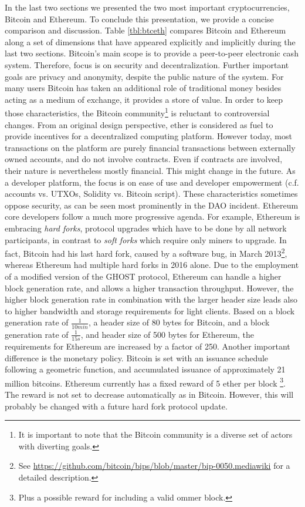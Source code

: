 {In the last two sections we presented the two most important cryptocurrencies, Bitcoin and Ethereum. 
To conclude this presentation, we provide a concise comparison and discussion. Table \ref{tbl:btceth} compares Bitcoin and Ethereum along a set of dimensions that have appeared explicitly and implicitly during the last two sections. Bitcoin's main scope is to provide a peer-to-peer electronic cash system. Therefore, focus is on security and decentralization. Further important goals are privacy and anonymity, despite the public nature of the system. For many users Bitcoin has taken an additional role of traditional money besides acting as a medium of exchange, it provides a store of value. In order to keep those characteristics, the Bitcoin community\footnote{It is important to note that the Bitcoin community is a diverse set of actors with diverting goals.} is reluctant to controversial changes. From an original design perspective, ether is considered as fuel to provide incentives for a decentralized computing platform. However today, most transactions on the platform are purely financial transactions between externally owned accounts, and do not involve contracts. Even if contracts are involved, their nature is nevertheless mostly financial. This might change in the future. As a developer platform, the focus is on ease of use and developer empowerment (c.f. accounts vs. \ac{UTXO}s, Solidity vs. Bitcoin script). These characteristics sometimes oppose security, as can be seen most prominently in the DAO incident. Ethereum core developers follow a much more progressive agenda. For example, Ethereum is embracing \emph{hard forks}, protocol upgrades which have to be done by all network participants, in contrast to \emph{soft forks} which require only miners to upgrade. In fact, Bitcoin had his last hard fork, caused by a software bug, in March 2013\footnote{See \url{https://github.com/bitcoin/bips/blob/master/bip-0050.mediawiki} for a detailed description.}, whereas Ethereum had multiple hard forks in 2016 alone. 
Due to the employment of a modified version of the \ac{GHOST} protocol, Ethereum can handle a higher block generation rate, and allows a higher transaction throughput. However, the higher block generation rate in combination with the larger header size leads also to higher bandwidth and storage requirements for light clients. Based on a block generation rate of $\frac{1}{10 min}$, a header size of 80 bytes for Bitcoin, and a block generation rate of $\frac{1}{15 s}$, and header size of 500 bytes for Ethereum, the requirements for Ethereum are increased by a factor of 250. Another important difference is the monetary policy. Bitcoin is set with an issuance schedule following a geometric function, and accumulated issuance of approximately 21 million bitcoins. Ethereum currently has a fixed reward of 5 ether per block \parencite{ethmining}\footnote{Plus a possible reward for including a valid ommer block.}. The reward is not set to decrease automatically as in Bitcoin. However, this will probably be changed with a future hard fork protocol update. 

}
